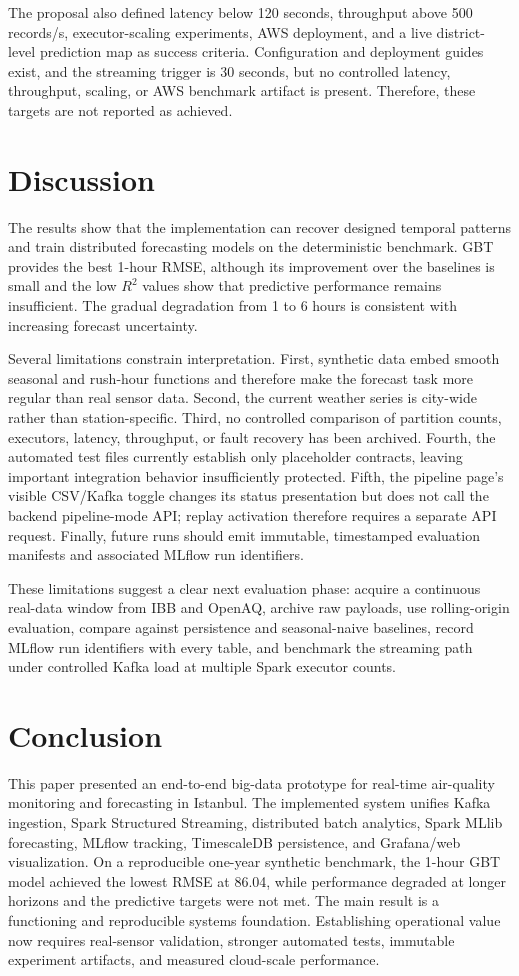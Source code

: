 \documentclass[12pt,a4paper]{article}
\begin{document}
The proposal also defined latency below 120 seconds, throughput above 500
records/s, executor-scaling experiments, AWS deployment, and a live
district-level prediction map as success criteria. Configuration and
deployment guides exist, and the streaming trigger is 30 seconds, but no
controlled latency, throughput, scaling, or AWS benchmark artifact is present.
Therefore, these targets are not reported as achieved.

\section{Discussion}
The results show that the implementation can recover designed temporal
patterns and train distributed forecasting models on the deterministic
benchmark. GBT provides the best 1-hour RMSE, although its improvement over the
baselines is small and the low $R^2$ values show that predictive performance
remains insufficient. The gradual degradation from 1 to 6 hours is consistent
with increasing forecast uncertainty.

Several limitations constrain interpretation. First, synthetic data embed
smooth seasonal and rush-hour functions and therefore make the forecast task
more regular than real sensor data. Second, the current weather series is
city-wide rather than station-specific. Third, no controlled comparison of
partition counts, executors, latency, throughput, or fault recovery has been
archived. Fourth, the automated test files currently establish only placeholder
contracts, leaving important integration behavior insufficiently protected.
Fifth, the pipeline page's visible CSV/Kafka toggle changes its status
presentation but does not call the backend pipeline-mode API; replay activation
therefore requires a separate API request. Finally, future runs should emit
immutable, timestamped evaluation manifests and associated MLflow run
identifiers.

These limitations suggest a clear next evaluation phase: acquire a continuous
real-data window from IBB and OpenAQ, archive raw payloads, use rolling-origin
evaluation, compare against persistence and seasonal-naive baselines, record
MLflow run identifiers with every table, and benchmark the streaming path
under controlled Kafka load at multiple Spark executor counts.

\section{Conclusion}
This paper presented an end-to-end big-data prototype for real-time air-quality
monitoring and forecasting in Istanbul. The implemented system unifies Kafka
ingestion, Spark Structured Streaming, distributed batch analytics, Spark
MLlib forecasting, MLflow tracking, TimescaleDB persistence, and Grafana/web
visualization. On a reproducible one-year synthetic benchmark, the 1-hour GBT
model achieved the lowest RMSE at 86.04, while performance degraded at longer
horizons and the predictive targets were not met. The main result is a functioning and
reproducible systems foundation. Establishing operational value now requires
real-sensor validation, stronger automated tests, immutable experiment
artifacts, and measured cloud-scale performance.
\end{document}
